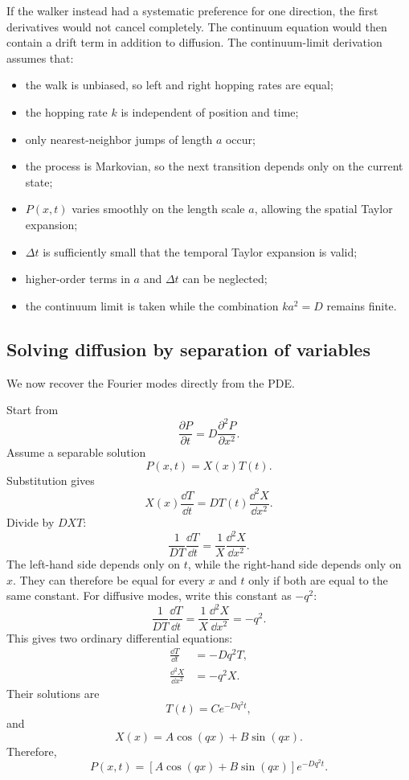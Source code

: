 If the walker instead had a systematic preference for one direction, the first derivatives would not cancel completely.
The continuum equation would then contain a drift term in addition to diffusion.
% 
% 
The continuum-limit derivation assumes that:
\begin{itemize}
    \item the walk is unbiased, so left and right hopping rates are equal;
    \item the hopping rate $k$ is independent of position and time;
    \item only nearest-neighbor jumps of length $a$ occur;
    \item the process is Markovian, so the next transition depends only on the current state;
    \item $P(x,t)$ varies smoothly on the length scale $a$, allowing the spatial Taylor expansion;
    \item $\Delta t$ is sufficiently small that the temporal Taylor expansion is valid;
    \item higher-order terms in $a$ and $\Delta t$ can be neglected;
    \item the continuum limit is taken while the combination $ka^2=D$ remains finite.
\end{itemize}



\subsection{Solving diffusion by separation of variables}
\label{deriv:separation}



We now recover the Fourier modes directly from the PDE.

Start from
% 
\[
    \frac{\partial P}{\partial t} = D\frac{\partial^2P}{\partial x^2}.
\]
% 
Assume a separable solution
% 
\[
    P(x,t) = X(x) T(t).
\]
% 
Substitution gives
% 
\[
    X(x)\frac{\dd T}{\dd t} = DT(t)\frac{\dd^2X}{\dd x^2}.
\]
% 
Divide by $DXT$:
% 
\[
    \frac{1}{DT} \frac{\dd T}{\dd t} = \frac{1}{X} \frac{\dd^2X}{\dd x^2}.
\]
% 
The left-hand side depends only on $t$, while the right-hand side depends only on $x$. 
They can therefore be equal for every $x$ and $t$ only if both are equal to the same constant.
For diffusive modes, write this constant as $-q^2$:
% 
\[
    \frac{1}{DT} \frac{\dd T}{\dd t} = \frac{1}{X} \frac{\dd^2X}{\dd x^2} = -q^2.
\]
% 
This gives two ordinary differential equations:
% 
\begin{align*}
    \frac{\dd T}{\dd t} &= -Dq^2T,
    \\
    \frac{\dd^2X}{\dd x^2} &= -q^2X.
\end{align*}
% 
Their solutions are
% 
\[
    T(t) = Ce^{-Dq^2t},
\]
% 
and
% 
\[
    X(x) = A\cos(qx) + B\sin(qx).
\]
% 
Therefore,
% 
\[
    P(x,t) = \left[ A\cos(qx)+B\sin(qx) \right] e^{-Dq^2t}.
\]

